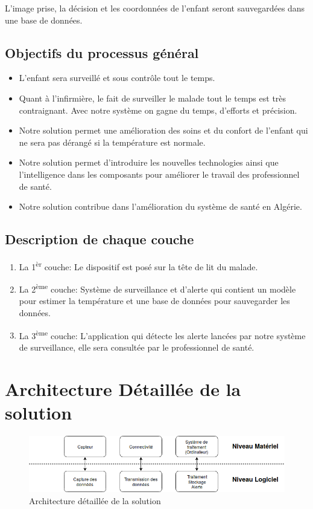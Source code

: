 \documentclass[12pt]{article}
\begin{document}
L'image prise, la décision et les coordonnées de l'enfant seront sauvegardées dans une base de données.

\subsection{Objectifs du processus général}
\begin{itemize}
	\item L’enfant sera surveillé et sous contrôle tout le temps.
	\item Quant à l'infirmière, le fait de surveiller le malade tout le temps est très contraignant. Avec notre système on gagne du temps, d'efforts et précision.	
	\item Notre solution permet une amélioration des soins et du confort de l'enfant qui ne sera pas dérangé si la température est normale.
		\item Notre solution permet d'introduire les nouvelles technologies ainsi que l'intelligence dans les composants pour améliorer le travail des professionnel de santé.
	\item Notre solution contribue dans l'amélioration du système de santé en Algérie.
\end{itemize}

\subsection{Description de chaque couche}
\begin{enumerate}
		\item La 1\textsuperscript{èr} couche: Le dispositif est posé sur la tête de lit du malade. 
		\item La 2\textsuperscript{ème} couche: Système de surveillance et d'alerte qui contient  un modèle pour estimer la température et une base de données pour sauvegarder les données.
		\item La 3\textsuperscript{ème} couche: L'application qui détecte les alerte lancées par notre système de surveillance, elle sera consultée par le professionnel de santé.
\end{enumerate}

\section{Architecture Détaillée de la solution}

\begin{figure}[h]
	\centering
	\includegraphics[width=14cm]{img-Chapiter-3/architecturedetaillee.png}
	\caption{Architecture détaillée de la solution}
\end{figure}
\end{document}
